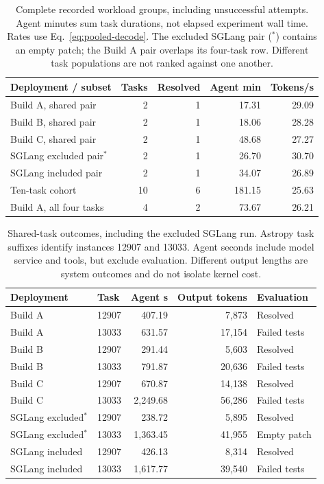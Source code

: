 \begin{table}[t]
\caption{Complete recorded workload groups, including unsuccessful attempts. Agent minutes sum task durations, not elapsed experiment wall time. Rates use Eq.~\ref{eq:pooled-decode}. The excluded SGLang pair ($^*$) contains an empty patch; the Build A pair overlaps its four-task row. Different task populations are not ranked against one another.}
\label{tab:all-attempts}
\centering\small
\begin{tabular}{@{}lrrrr@{}}
\toprule
Deployment / subset & Tasks & Resolved & Agent min & Tokens/s \\
\midrule
Build A, shared pair & 2 & 1 & 17.31 & 29.09 \\
Build B, shared pair & 2 & 1 & 18.06 & 28.28 \\
Build C, shared pair & 2 & 1 & 48.68 & 27.27 \\
SGLang excluded pair$^{*}$ & 2 & 1 & 26.70 & 30.70 \\
SGLang included pair & 2 & 1 & 34.07 & 26.89 \\
Ten-task cohort & 10 & 6 & 181.15 & 25.63 \\
Build A, all four tasks & 4 & 2 & 73.67 & 26.21 \\
\bottomrule
\end{tabular}
\end{table}

\begin{table}[t]
\caption{Shared-task outcomes, including the excluded SGLang run. Astropy task suffixes identify instances 12907 and 13033. Agent seconds include model service and tools, but exclude evaluation. Different output lengths are system outcomes and do not isolate kernel cost.}
\label{tab:paired-agent-time}
\centering\small
\begin{tabular}{@{}llrrl@{}}
\toprule
Deployment & Task & Agent s & Output tokens & Evaluation \\
\midrule
Build A & 12907 & 407.19 & 7,873 & Resolved \\
Build A & 13033 & 631.57 & 17,154 & Failed tests \\
Build B & 12907 & 291.44 & 5,603 & Resolved \\
Build B & 13033 & 791.87 & 20,636 & Failed tests \\
Build C & 12907 & 670.87 & 14,138 & Resolved \\
Build C & 13033 & 2,249.68 & 56,286 & Failed tests \\
SGLang excluded$^{*}$ & 12907 & 238.72 & 5,895 & Resolved \\
SGLang excluded$^{*}$ & 13033 & 1,363.45 & 41,955 & Empty patch \\
SGLang included & 12907 & 426.13 & 8,314 & Resolved \\
SGLang included & 13033 & 1,617.77 & 39,540 & Failed tests \\
\bottomrule
\end{tabular}
\end{table}

